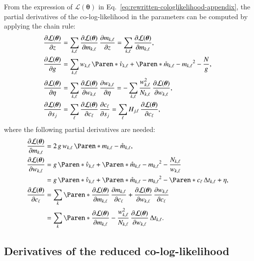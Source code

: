 \documentclass{aa}
\newcommand*{\PDer}[2]{\frac{\partial#1}{\partial#2}}
\newcommand*{\empirical}[1]{\mathring{#1}}
\newcommand*{\V}[1]{\boldsymbol{#1}}   %
\newcommand*{\MC}[1]{\mathcal{#1}}
\newcommand*{\lkl}{\MC{L}}
\begin{document}
\begin{appendix}
From the expression of $\lkl(\V\theta)$ in
Eq.~\eqref{eq:rewritten-cologlikelihood-appendix}, the partial derivatives of
the co-log-likelihood in the parameters can be computed by applying the chain
rule:
\begin{align}
  \PDer{\lkl(\V\theta)}{z}
  &= \sum_{k,\ell}\PDer{\lkl(\V\theta)}{m_{k,\ell}}\,\PDer{m_{k,\ell}}{z}
  = \sum_{k,\ell}\PDer{\lkl(\V\theta)}{m_{k,\ell}},
  \\
  \PDer{\lkl(\V\theta)}{g}
  &= \sum_{k,\ell} w_{k,\ell}\,\Paren*{
      \empirical{v}_{k,\ell}
      + \Paren*{\empirical{m}_{k,\ell} - m_{k,\ell}}^2
  } - \frac{N}{g},
  \\
  \PDer{\lkl(\V\theta)}{\eta}
  &=
  \sum_{k,\ell}\PDer{\lkl(\V\theta)}{w_{k,\ell}}\,\PDer{w_{k,\ell}}{\eta}
  = - \sum_{k,\ell}\frac{w_{k,\ell}^2}{N_{k,\ell}}\,
      \PDer{\lkl(\V\theta)}{w_{k,\ell}},
  \\
  \PDer{\lkl(\V\theta)}{s_j}
  &= \sum_{\ell}\PDer{\lkl(\V\theta)}{c_\ell}\,\PDer{c_\ell}{s_j}
   = \sum_\ell H_{j,\ell}\,\PDer{\lkl(\V\theta)}{c_\ell},
\end{align}
where the following partial derivatives are needed:
\begin{align}
  \PDer{\lkl(\V\theta)}{m_{k,\ell}}
  &= 2\,g\,w_{k,\ell}\,\Paren*{m_{k,\ell} - \empirical{m}_{k,\ell}},
  \\
  \PDer{\lkl(\V\theta)}{w_{k,\ell}}
  &= g\,\Paren*{
      \empirical{v}_{k,\ell}
      + \Paren*{\empirical{m}_{k,\ell} - m_{k,\ell}}^2
    } - \frac{N_{k,\ell}}{w_{k,\ell}}\notag\\
  &=g\,\Paren*{
      \empirical{v}_{k,\ell}
      + \Paren*{\empirical{m}_{k,\ell} - m_{k,\ell}}^2
  } - \Paren*{c_{\ell}\,\Delta t_{k,\ell} + \eta},\\
  \PDer{\lkl(\V\theta)}{c_\ell}
  &= \sum_{k}\Paren*{
    \PDer{\lkl(\V\theta)}{m_{k,\ell}}\,\PDer{m_{k,\ell}}{c_\ell}
    + \PDer{\lkl(\V\theta)}{w_{k,\ell}}\,\PDer{w_{k,\ell}}{c_\ell}
  }\notag\\
  &= \sum_k \Paren*{
      \PDer{\lkl(\V\theta)}{m_{k,\ell}}
      - \frac{w_{k,\ell}^2}{N_{k,\ell}}\,\PDer{\lkl(\V\theta)}{w_{k,\ell}}
  }\,\Delta t_{k,\ell}.
\end{align}


\subsection{Derivatives of the reduced co-log-likelihood}
\label{sec:marginal-cologlikelihood-derivatives}


\end{appendix}
\end{document}
